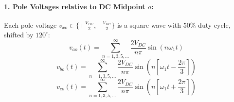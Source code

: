 \paragraph{1. Pole Voltages relative to DC Midpoint $o$:}
Each pole voltage $v_{xo} \in \{+\frac{V_{DC}}{2}, -\frac{V_{DC}}{2}\}$ is a square wave with $50\%$ duty cycle, shifted by $120^\circ$:
\begin{equation}
v_{ao}(t) = \sum_{n=1,3,5,\dots}^\infty \frac{2 V_{DC}}{n\pi} \sin(n\omega_1 t)
\end{equation}
\begin{equation}
v_{bo}(t) = \sum_{n=1,3,5,\dots}^\infty \frac{2 V_{DC}}{n\pi} \sin\left(n\left[\omega_1 t - \frac{2\pi}{3}\right]\right)
\end{equation}
\begin{equation}
v_{co}(t) = \sum_{n=1,3,5,\dots}^\infty \frac{2 V_{DC}}{n\pi} \sin\left(n\left[\omega_1 t + \frac{2\pi}{3}\right]\right)
\end{equation}

